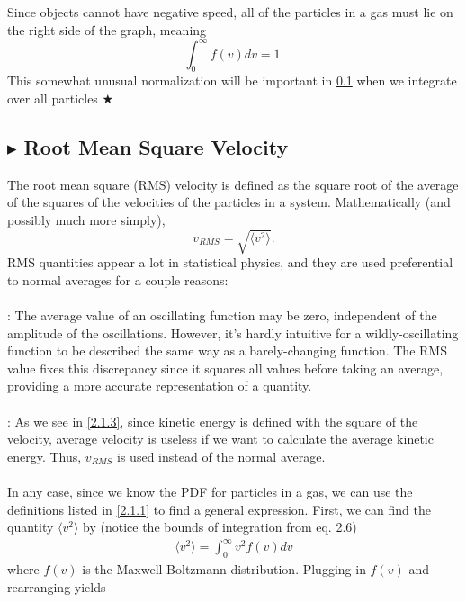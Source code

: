 \noindent Since objects cannot have negative speed, all of the particles in a gas must lie on the right side of the graph, meaning 
\begin{equation}
    \int_0^\infty f(v)dv = 1.
\end{equation}
\noindent This somewhat unusual normalization will be important in \ref{2.1.2} when we integrate over all particles $\bigstar$

%
%
\subsection{\color{Orchid} $\blacktriangleright$ \color{black} Root Mean Square Velocity}\label{2.1.2}
The root mean square (RMS) velocity is defined as the square root of the average of the squares of the velocities of the particles in a system. Mathematically (and possibly much more simply),
\begin{equation}
    v_{RMS} = \sqrt{\langle v^2\rangle}.
\end{equation}
\noindent RMS quantities appear a lot in statistical physics, and they are used preferential to normal averages for a couple reasons: \\
\\
: The average value of an oscillating function may be zero, independent of the amplitude of the oscillations. However, it's hardly intuitive for a wildly-oscillating function to be described the same way as a barely-changing function. The RMS value fixes this discrepancy since it squares all values before taking an average, providing a more accurate representation of a quantity.\\
\\
: As we see in \ref{2.1.3}, since kinetic energy is defined with the square of the velocity, average velocity is useless if we want to calculate the average kinetic energy. Thus, $v_{RMS}$ is used instead of the normal average.\\
\\
\noindent In any case, since we know the PDF for particles in a gas, we can use the definitions listed in \ref{2.1.1} to find a general expression. First, we can find the quantity $\langle v^2\rangle$ by (notice the bounds of integration from eq. 2.6)
\begin{align}
    \langle v^2\rangle = \int_{0}^{\infty}v^2f(v)dv
\end{align}
\noindent where $f(v)$ is the Maxwell-Boltzmann distribution. Plugging in $f(v)$ and rearranging yields
